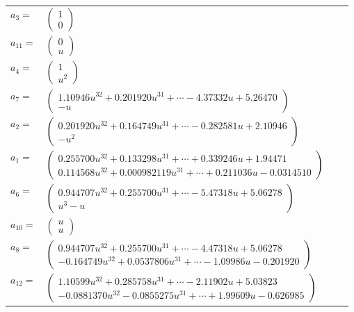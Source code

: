 \documentclass[1p]{elsarticle_modified}
\theoremstyle{definition}
\begin{document}
\begin{tabular}{m{7pt} m{180pt} m{7pt} m{180pt} }
\flushright $a_{3}=$&$\begin{pmatrix}1\\0\end{pmatrix}$ \\
\flushright $a_{11}=$&$\begin{pmatrix}0\\u\end{pmatrix}$ \\
\flushright $a_{4}=$&$\begin{pmatrix}1\\u^2\end{pmatrix}$ \\
\flushright $a_{7}=$&$\begin{pmatrix}1.10946 u^{32}+0.201920 u^{31}+\cdots-4.37332 u+5.26470\\- u\end{pmatrix}$ \\
\flushright $a_{2}=$&$\begin{pmatrix}0.201920 u^{32}+0.164749 u^{31}+\cdots-0.282581 u+2.10946\\- u^2\end{pmatrix}$ \\
\flushright $a_{1}=$&$\begin{pmatrix}0.255700 u^{32}+0.133298 u^{31}+\cdots+0.339246 u+1.94471\\0.114568 u^{32}+0.000982119 u^{31}+\cdots+0.211036 u-0.0314510\end{pmatrix}$ \\
\flushright $a_{6}=$&$\begin{pmatrix}0.944707 u^{32}+0.255700 u^{31}+\cdots-5.47318 u+5.06278\\u^3- u\end{pmatrix}$ \\
\flushright $a_{10}=$&$\begin{pmatrix}u\\u\end{pmatrix}$ \\
\flushright $a_{8}=$&$\begin{pmatrix}0.944707 u^{32}+0.255700 u^{31}+\cdots-4.47318 u+5.06278\\-0.164749 u^{32}+0.0537806 u^{31}+\cdots-1.09986 u-0.201920\end{pmatrix}$ \\
\flushright $a_{12}=$&$\begin{pmatrix}1.10599 u^{32}+0.285758 u^{31}+\cdots-2.11902 u+5.03823\\-0.0881370 u^{32}-0.0855275 u^{31}+\cdots+1.99609 u-0.626985\end{pmatrix}$ \\

\end{tabular}
\end{document}
